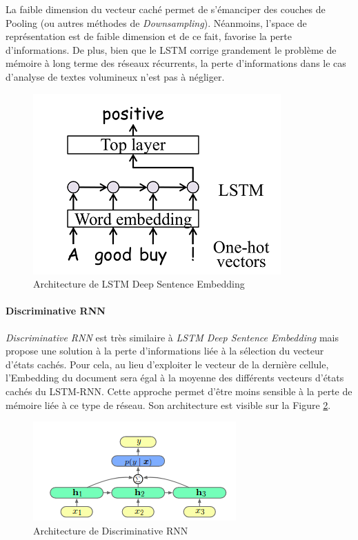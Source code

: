 \noindent La faible dimension du vecteur caché permet de s'émanciper des couches de Pooling (ou autres méthodes de \textit{Downsampling}). Néanmoins, l'space de représentation est de faible dimension et de ce fait, favorise la perte d'informations. De plus, bien que le LSTM corrige grandement le problème de mémoire à long terme des réseaux récurrents, la perte d'informations dans le cas d'analyse de textes volumineux n'est pas à négliger.

\begin{figure}
\centering
\includegraphics[scale=0.3]{./tex/natural-language-processing/lstmrnn.png}
\caption{Architecture de LSTM Deep Sentence Embedding}
\label{lstmrnn}
\end{figure}

\paragraph{Discriminative RNN}
\textit{Discriminative RNN}\cite{discrimi} est très similaire à \textit{LSTM Deep Sentence Embedding} mais propose une solution à la perte d'informations liée à la sélection du vecteur d'états cachés. Pour cela, au lieu d'exploiter le vecteur de la dernière cellule, l'Embedding du document sera égal à la moyenne des différents vecteurs d'états cachés du LSTM-RNN. Cette approche permet d'être moins sensible à la perte de mémoire liée à ce type de réseau. Son architecture est visible sur la Figure
\ref{discrimini}.

\begin{figure}
\centering
\includegraphics[scale=0.4]{./tex/natural-language-processing/discrimi.png}
\caption{Architecture de Discriminative RNN}
\label{discrimini}
\end{figure}

